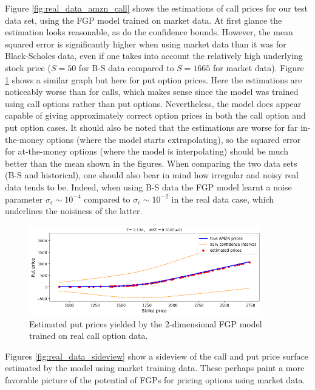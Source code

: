 \documentclass[a4paper,12pt]{article}
\begin{document}
\noindent Figure \ref{fig:real_data_amzn_call} shows the estimations of call prices for our test data set, using the FGP model trained on market data. At first glance the estimation looks reasonable, as do the confidence bounds. However, the mean squared error is significantly higher when using market data than it was for Black-Scholes data, even if one takes into account the relatively high underlying stock price ($S = 50$ for B-S data compared to $S = 1665$ for market data). Figure \ref{fig:real_data_amzn_put} shows a similar graph but here for put option prices. Here the estimations are noticeably worse than for calls, which makes sense since the model was trained using call options rather than put options. Nevertheless, the model does appear capable of giving approximately correct option prices in both the call option and put option cases. It should also be noted that the estimations are worse for far in-the-money options (where the model starts extrapolating), so the squared error for at-the-money options (where the model is interpolating) should be much better than the mean shown in the figures. When comparing the two data sets (B-S and historical), one should also bear in mind how irregular and noisy real data tends to be. Indeed, when using B-S data the FGP model learnt a noise parameter $\sigma_\epsilon \sim 10^{-4}$ compared to $\sigma_\epsilon \sim 10^{-2}$ in the real data case, which underlines the noisiness of the latter.
\begin{figure} [H]
    \centering
    \includegraphics[width=0.9\textwidth]{real_data_amzn_put.png}
    \caption{Estimated put prices yielded by the 2-dimensional FGP model trained on real call option data.}
    \label{fig:real_data_amzn_put}
\end{figure}
\noindent Figures \ref{fig:real_data_sideview} show a sideview of the call and put price surface estimated by the model using market training data. These perhaps paint a more favorable picture of the potential of FGPs for pricing options using market data.
\end{document}
